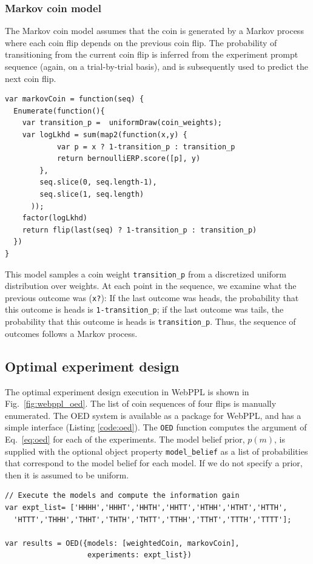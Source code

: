 \documentclass{article}
\begin{document}
\subsubsection{Markov coin model}
\label{s:tutorial:sss:markov}
The Markov coin model assumes that the coin is generated by a Markov process where each coin flip depends on the previous coin flip. The probability of transitioning from the current coin flip is inferred from the experiment prompt sequence (again, on a trial-by-trial basis), and is subsequently used to predict the next coin flip.
%
\begin{lstlisting}[caption=Markov coin model]
var markovCoin = function(seq) {
  Enumerate(function(){
    var transition_p =  uniformDraw(coin_weights);
    var logLkhd = sum(map2(function(x,y) {
    		var p = x ? 1-transition_p : transition_p
     	 	return bernoulliERP.score([p], y)
    	},
    	seq.slice(0, seq.length-1),
    	seq.slice(1, seq.length)
	  ));
    factor(logLkhd)
    return flip(last(seq) ? 1-transition_p : transition_p)
  })
}
\end{lstlisting}
%
This model samples a coin weight \lstinline{transition_p} from a discretized uniform distribution over weights. 
At each point in the sequence, we examine what the previous outcome was (\lstinline{x?}): If the last outcome was heads, the probability that this outcome is heads is \lstinline{1-transition_p}; if the last outcome was tails, the probability that this outcome is heads is \lstinline{transition_p}. Thus, the sequence of outcomes follows a Markov process.

\subsection{Optimal experiment design}

The optimal experiment design execution in WebPPL is shown in Fig.~\ref{fig:webppl_oed}. 
The list of coin sequences of four flips is manually enumerated. 
The OED system is available as a package for WebPPL, and has a simple interface (Listing \ref{code:oed}).
The \lstinline{OED} function computes the argument of Eq.~\ref{eq:oed} for each of the experiments.
The model belief prior, $p(m)$, is supplied with the optional object property \lstinline{model_belief} as a list of probabilities that correspond to the model belief for each model. If we do not specify a prior, then it is assumed to be uniform.

\begin{lstlisting}[caption=OED call]
// Execute the models and compute the information gain
var expt_list= ['HHHH','HHHT','HHTH','HHTT','HTHH','HTHT','HTTH',
  'HTTT','THHH','THHT','THTH','THTT','TTHH','TTHT','TTTH','TTTT'];

var results = OED({models: [weightedCoin, markovCoin],
                   experiments: expt_list})
\end{lstlisting}
\label{code:oed}
%
\end{document}
